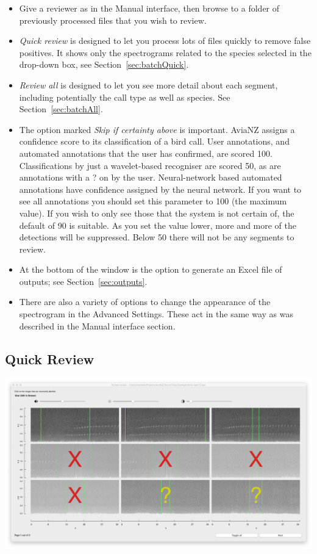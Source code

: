 \documentclass{scrartcl}
\begin{document}
\begin{itemize}
\item Give a reviewer as in the Manual interface, then browse to a folder of previously processed files that you wish to review.
\item \textit{Quick review} is designed to let you process lots of files quickly to remove false positives. It shows only the spectrograms related to the species selected in the drop-down box, see Section~\ref{sec:batchQuick}.
\item \textit{Review all} is designed to let you see more detail about each segment, including potentially the call type as well as species. See Section~\ref{sec:batchAll}.
\item The option marked \textit{Skip if certainty above} is important. AviaNZ assigns a confidence score to its classification of a bird call. User annotations, and automated annotations that the user has confirmed, are scored 100. Classifications by just a wavelet-based recogniser are scored 50, as are annotations with a ? on by the user. Neural-network based automated annotations have confidence assigned by the neural network. If you want to see all annotations you should set this parameter to 100 (the maximum value). If you wish to only see those that the system is not certain of, the default of 90 is suitable. As you set the value lower, more and more of the detections will be suppressed. Below 50 there will not be any segments to review.
\item At the bottom of the window is the option to generate an Excel file of outputs; see Section~\ref{sec:outputs}.
\item There are also a variety of options to change the appearance of the spectrogram in the Advanced Settings. These act in the same way as was described in the Manual interface section.
\end{itemize}

\subsection{Quick Review\label{sec:batchQuick}}

\begin{center}
	\includegraphics[width=.9\textwidth]{Figures/BatchReview2}
\end{center}
\end{document}
